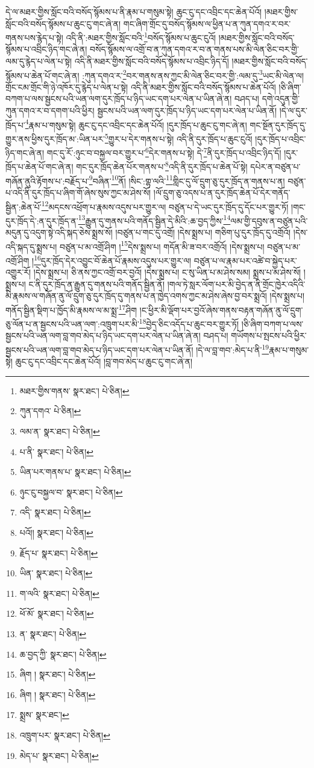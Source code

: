 དེ་ལ་མཐར་གྱིས་སློང་བའི་བསོད་སྙོམས་པ་ནི་རྣམ་པ་གསུམ་སྟེ། ཆུང་ངུ་དང་འབྲིང་དང་ཆེན་པོའོ། །མཐར་གྱིས་སློང་བའི་བསོད་སྙོམས་པ་ཆུང་ངུ་གང་ཞེ་ན། གང་ཞིག་གྲོང་དུ་བསོད་སྙོམས་ལ་ཕྱིན་པ་ན་ཀུན་དགའ་ར་བར་གནས་པས་རྙེད་པ་སྟེ། འདི་ནི་:མཐར་གྱིས་སློང་བའི་\footnote{མཐར་གྱིས་གནས་  སྣར་ཐང་།  པེ་ཅིན། }བསོད་སྙོམས་པ་ཆུང་ངུའོ། །མཐར་གྱིས་སློང་བའི་བསོད་སྙོམས་པ་འབྲིང་ཉིད་གང་ཞེ་ན། བསོད་སྙོམས་ལ་འགྲོ་བ་ན་ཀུན་དགའ་ར་བ་ན་གནས་པས་མི་ལེན་ཅིང་བར་གྱི་ལམ་དུ་རྙེད་པ་ལེན་པ་སྟེ། འདི་ནི་མཐར་གྱིས་སློང་བའི་བསོད་སྙོམས་པ་འབྲིང་ཉིད་དོ། །མཐར་གྱིས་སློང་བའི་བསོད་སྙོམས་པ་ཆེན་པོ་གང་ཞེ་ན། :ཀུན་དགའ་ར་\footnote{ཀུན་དགའ་  པེ་ཅིན། }བར་གནས་ནས་ཀྱང་མི་ལེན་ཅིང་བར་གྱི་:ལམ་དུ་\footnote{ལམ་ན་  སྣར་ཐང་།  པེ་ཅིན། }ཡང་མི་ལེན་ལ། གྲོང་ངམ་གྲོང་གི་ཉེ་འཁོར་དུ་རྙེད་པ་ལེན་པ་སྟེ། འདི་ནི་མཐར་གྱིས་སློང་བའི་བསོད་སྙོམས་པ་ཆེན་པོའོ། །ཅི་ཞིག་བཀག་པ་ལས་སྦྱངས་པའི་ཡན་ལག་དུར་ཁྲོད་པ་ཉིད་ཡང་དག་པར་ལེན་པ་ཡིན་ཞེ་ན། བཤད་པ། དགེ་འདུན་གྱི་ཀུན་དགའ་ར་བ་དགག་པའི་ཕྱིར། སྦྱངས་པའི་ཡན་ལག་དུར་ཁྲོད་པ་ཉིད་ཡང་དག་པར་ལེན་པ་ཡིན་ནོ། །དེ་ལ་དུར་ཁྲོད་པ་\footnote{པ་ནི་  སྣར་ཐང་།  པེ་ཅིན། }རྣམ་པ་གསུམ་སྟེ། ཆུང་ངུ་དང་འབྲིང་དང་ཆེན་པོའོ། །དུར་ཁྲོད་པ་ཆུང་ངུ་གང་ཞེ་ན། གང་སྔོན་དུར་ཁྲོད་དུ་གྱུར་ནས་ཕྱིས་དུར་ཁྲོད་མ་:ཡིན་པར་\footnote{ཡིན་པར་གནས་པ་  སྣར་ཐང་།  པེ་ཅིན། }གྱུར་པ་དེར་གནས་པ་སྟེ། འདི་ནི་དུར་ཁྲོད་པ་ཆུང་ངུའོ། །དུར་ཁྲོད་པ་འབྲིང་ཉིད་གང་ཞེ་ན། གང་དུ་རོ་:ཉུང་བ་བསྐྱལ་བར་གྱུར་པ་\footnote{ཉུང་ངུ་བསྐྱལ་བ་  སྣར་ཐང་།  པེ་ཅིན། }དེར་གནས་པ་སྟེ། དེ་\footnote{འདི་  སྣར་ཐང་།  པེ་ཅིན། }ནི་དུར་ཁྲོད་པ་འབྲིང་ཉིད་དོ། །དུར་ཁྲོད་པ་ཆེན་པོ་གང་ཞེ་ན། གང་དུར་ཁྲོད་ཆེན་པོར་གནས་པ་\footnote{པའོ།།  སྣར་ཐང་།  པེ་ཅིན། }འདི་ནི་དུར་ཁྲོད་པ་ཆེན་པོ་སྟེ། དཔེར་ན་བཙུན་པ་གཞོན་ནུའི་རྟོགས་པ་:བརྗོད་པ་\footnote{རྗོད་པ་  སྣར་ཐང་།  པེ་ཅིན། }བཞིན་\footnote{ཡིན་  སྣར་ཐང་།  པེ་ཅིན། }ནོ། །སིང་:གྷ་ལའི་\footnote{ག་ལའི་  སྣར་ཐང་།  པེ་ཅིན། }གླིང་དུ་ལོ་དྲུག་ཅུ་དུར་ཁྲོད་ན་གནས་པ་ན། བཙུན་པ་འདི་ནི་དུར་ཁྲོད་པ་ཞིག་གོ་ཞེས་སུས་ཀྱང་མ་ཤེས་སོ། །ལོ་དྲུག་ཅུ་འདས་པ་ན་དུར་ཁྲོད་ཆེན་པོ་དེར་གནོད་སྦྱིན་:ཆེན་པོ་\footnote{ཕོ་མོ་  སྣར་ཐང་།  པེ་ཅིན། }མདངས་འཕྲོག་པ་རྣམས་འདུས་པར་གྱུར་ལ། བཙུན་པ་དེ་ཡང་དུར་ཁྲོད་དུ་དོང་པར་གྱུར་ཏོ། །གང་དུར་ཁྲོད་དེ་:ན་དུར་ཁྲོད་ན་\footnote{ན་  སྣར་ཐང་།  པེ་ཅིན། }རྒྱུན་དུ་གནས་པའི་གནོད་སྦྱིན་དེ་མིའི་:ཆ་བྱད་ཀྱིས་\footnote{ཆ་བྱད་ཀྱི་  སྣར་ཐང་།  པེ་ཅིན། }ལམ་གྱི་དབུས་ན་བཙུན་པའི་མདུན་དུ་འདུག་སྟེ་འདི་སྐད་ཅེས་སྨྲས་སོ། །བཙུན་པ་གང་དུ་འགྲོ། །དེས་སྨྲས་པ། གཅིག་པུ་དུར་ཁྲོད་དུ་འགྲོའོ། །དེས་འདི་སྐད་དུ་སྨྲས་པ། བཙུན་པ་མ་འགྲོ་ཤིག །\footnote{ཞིག །  སྣར་ཐང་།  པེ་ཅིན། }དེས་སྨྲས་པ། གདོན་མི་ཟ་བར་འགྲོའོ། །དེས་སྨྲས་པ། བཙུན་པ་མ་འགྲོ་ཤིག །\footnote{ཞིག །  སྣར་ཐང་།  པེ་ཅིན། }དུར་ཁྲོད་དེར་འབྱུང་བོ་ཆེན་པོ་རྣམས་འདུས་པར་གྱུར་ལ། བཙུན་པ་ལ་རྣམ་པར་འཚེ་བ་སྐྱེད་པར་འགྱུར་རོ། །དེས་སྨྲས་པ། ཅི་ནས་ཀྱང་འགྲོ་བར་བྱའོ། །དེས་སྨྲས་པ། ང་སུ་ཡིན་པ་མ་ཤེས་སམ། སྨྲས་པ་མ་ཤེས་སོ། །སྨྲས་པ། ང་ནི་དུར་ཁྲོད་ན་རྒྱུན་དུ་གནས་པའི་གནོད་སྦྱིན་ནོ། །གལ་ཏེ་སླར་ལོག་པར་མི་བྱེད་ན་ནི་གྲོང་ཁྱེར་འདིའི་མི་རྣམས་ལ་གཞོན་ནུ་ལོ་དྲུག་ཅུ་དུར་ཁྲོད་དུ་གནས་པ་ན་ཁྱེད་འགས་ཀྱང་མ་ཤེས་ཞེས་བྱ་བར་སྨྲའོ། །དེས་སྨྲས་པ། གནོད་སྦྱིན་སྡིག་པ་ཁྱོད་མི་རྣམས་ལ་མ་སྨྲ་\footnote{སྨྲས་  སྣར་ཐང་། }ཤིག །ང་ཕྱིར་མི་ལྡོག་པར་བྱའོ་ཞེས་གནས་བརྟན་གཞོན་ནུ་ལོ་དྲུག་ཅུ་ལོན་པ་ན་སྦྱངས་པའི་ཡན་ལག་:འཁྲུག་པར་མི་\footnote{འཁྲུག་པར་  སྣར་ཐང་།  པེ་ཅིན། }བྱེད་ཅིང་འདོད་པ་ཆུང་བར་གྱུར་ཏོ། །ཅི་ཞིག་བཀག་པ་ལས་སྦྱངས་པའི་ཡན་ལག་བླ་གབ་མེད་པ་ཉིད་ཡང་དག་པར་ལེན་པ་ཡིན་ཞེ་ན། བཤད་པ། གཡོགས་པ་སྤངས་པའི་ཕྱིར་སྦྱངས་པའི་ཡན་ལག་བླ་གབ་མེད་པ་ཉིད་ཡང་དག་པར་ལེན་པ་ཡིན་ནོ། །དེ་ལ་བླ་གབ་:མེད་པ་ནི་\footnote{མེད་པ་  སྣར་ཐང་།  པེ་ཅིན། }རྣམ་པ་གསུམ་སྟེ། ཆུང་ངུ་དང་འབྲིང་དང་ཆེན་པོའོ། །བླ་གབ་མེད་པ་ཆུང་ངུ་གང་ཞེ་ན། 